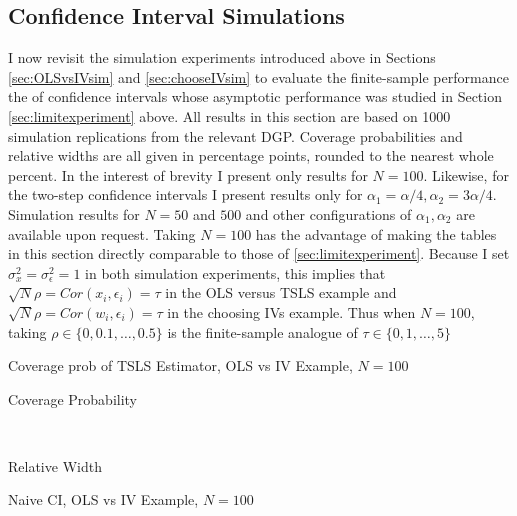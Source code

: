 \subsection{Confidence Interval Simulations}
\label{sec:CIsim}
I now revisit the simulation experiments introduced above in Sections \ref{sec:OLSvsIVsim} and \ref{sec:chooseIVsim} to evaluate the finite-sample performance the of confidence intervals whose asymptotic performance was studied in Section \ref{sec:limitexperiment} above.
All results in this section are based on 1000 simulation replications from the relevant DGP.
Coverage probabilities and relative widths are all given in percentage points, rounded to the nearest whole percent.
In the interest of brevity I present only results for $N=100$.
Likewise, for the two-step confidence intervals I present results only for $\alpha_1 = \alpha/4, \alpha_2 = 3\alpha/4$.
Simulation results for $N=50$ and $500$ and other configurations of $\alpha_1,\alpha_2$ are available upon request.
Taking $N=100$ has the advantage of making the tables in this section directly comparable to those of \ref{sec:limitexperiment}.
Because I set $\sigma_x^2 = \sigma_\epsilon^2 = 1$ in both simulation experiments, this implies that $\sqrt{N}\rho = Cor(x_i,\epsilon_i) = \tau$ in the OLS versus TSLS example and $\sqrt{N}\rho = Cor(w_i, \epsilon_i) = \tau$ in the choosing IVs example. Thus when $N = 100$, taking $\rho \in \{0, 0.1, \dots, 0.5\}$ is the finite-sample analogue of $\tau \in \{0, 1, \dots, 5\}$



\begin{table}[h]
  \centering
  
  \caption{Coverage prob of TSLS Estimator, OLS vs IV Example, $N=100$}
  \label{tab:CISim100TSLS_OLSvsIV}
\end{table}



\begin{table}[h]
  \centering
  \begin{subtable}{0.48\textwidth}
    \caption{Coverage Probability}
    
  \end{subtable}
  ~
  \begin{subtable}{0.48\textwidth}
    \caption{Relative Width}
    
  \end{subtable}
  \caption{Naive CI, OLS vs IV Example, $N=100$}
  \label{tab:CISim100Naive_OLSvsIV}
\end{table}







